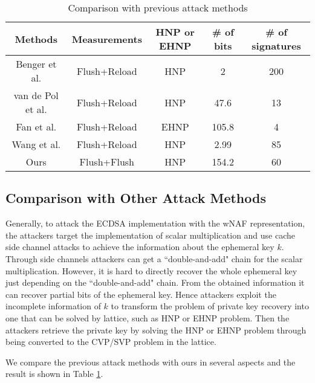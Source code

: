 \begin{table}[!t]
  \centering
   \caption{Comparison with previous attack methods}\label{compare1}
\begin{tabular}{|c|c|c|c|c|}
  \hline
  Methods & Measurements & HNP or EHNP & \# of bits & \# of signatures \\
  \hline
  Benger et al. \cite{Benger2014} & Flush+Reload & HNP & 2 & 200 \\
  \hline
  van de Pol et al. \cite{Van2015} & Flush+Reload & HNP & 47.6 & 13 \\
  \hline
  Fan et al. \cite{Fan2016} & Flush+Reload & EHNP & 105.8 & 4 \\
  \hline
  Wang et al. \cite{Wang2017} & Flush+Reload & HNP & 2.99 & 85 \\
  \hline
  Ours & Flush+Flush & HNP & 154.2  & 60 \\
  \hline
\end{tabular}
\end{table}

\subsection{Comparison with Other Attack Methods}
\label{compare}

 Generally,  to attack the ECDSA implementation with the wNAF representation,
   the attackers target the implementation of scalar multiplication
      and use cache side channel attacks to achieve the information about the ephemeral key $k$.
Through side channels attackers can get a ``double-and-add" chain for the scalar multiplication.
However,
 it is hard to directly recover the whole ephemeral key just depending on the ``double-and-add" chain.
From the obtained information it can recover partial bits of the ephemeral key.
Hence attackers exploit the incomplete information of $k$ to transform the problem of private key recovery into one that can be solved by lattice, such as HNP or EHNP problem.
 Then the attackers retrieve the private key by solving the HNP or EHNP problem through being converted to the CVP/SVP problem in the lattice.

We compare the previous attack methods with ours in several aspects and the result is shown in Table \ref{compare1}.

